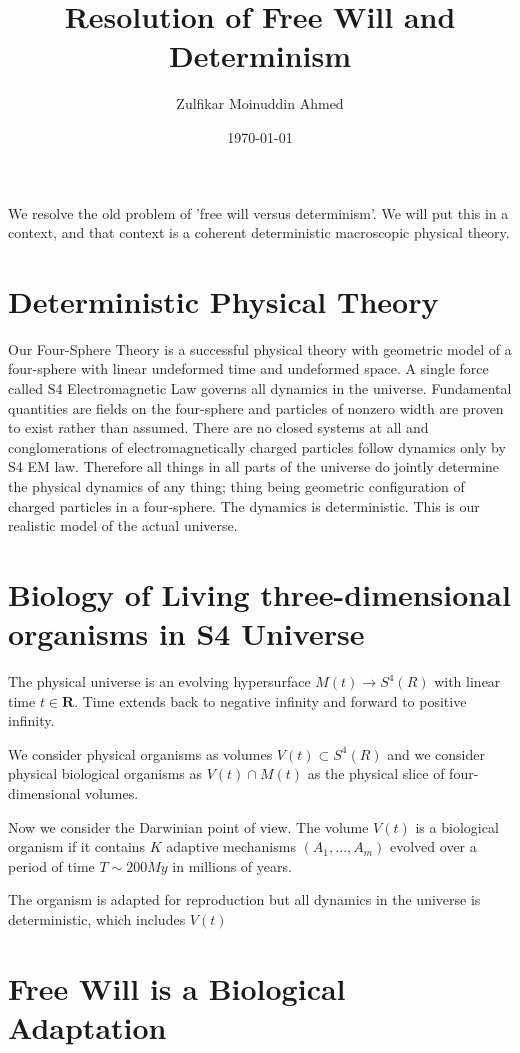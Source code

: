 \documentclass{amsart}
\title{Resolution of Free Will and Determinism}
\author{Zulfikar Moinuddin Ahmed}
\date{\today}
\begin{document}
\maketitle
We resolve the old problem of 'free will versus determinism'.  We will put this in a context, and that context is a coherent  deterministic macroscopic physical theory.

\section{Deterministic Physical Theory}
Our Four-Sphere Theory is a successful physical theory with geometric model of a four-sphere with linear undeformed time and undeformed space.  A single force called S4 Electromagnetic Law governs all dynamics in the universe.  Fundamental quantities are fields on the four-sphere and particles of nonzero width are proven to exist rather than assumed.  There are no closed systems at all and conglomerations of electromagnetically charged particles follow dynamics only by S4 EM law.  Therefore all things in all parts of the universe do jointly determine the physical dynamics of any thing; thing being geometric configuration of charged particles in a four-sphere.  The dynamics is deterministic.  This is our realistic model of the actual universe.

\section{Biology of Living three-dimensional organisms in S4 Universe}
The physical universe is an evolving hypersurface $M(t) \rightarrow S^4(R)$ with linear time $t\in \mathbf{R}$.  Time extends back to negative infinity and forward to positive infinity.

We consider physical organisms as volumes $V(t) \subset S^4(R)$ and we consider physical biological organisms as $V(t)\cap M(t)$ as the physical slice of four-dimensional volumes.

Now we consider the Darwinian point of view.  The volume $V(t)$ is a biological organism if it contains $K$ adaptive mechanisms  $(A_1,\dots, A_m)$ evolved over a period of time $T \sim 200 My$ in millions of years.  

The organism is adapted for reproduction but all dynamics in the universe is deterministic, which includes $V(t)$

\section{Free Will is a Biological Adaptation}
\end{document}
